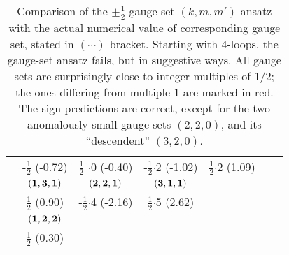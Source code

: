 \begin{table}
{\begin{tabular}{r@{~~~~}ccccc@{~~~~}l}
                 & -$\frac{1}{2}$ (-0.72)   & $\frac{1}{2}$  {\color{red} $\cdot 0$ (-0.40)}
                                        & -$\frac{1}{2}${\color{red}$\cdot$2} (-1.02)
                                             &  $\frac{1}{2}${\color{red}$\cdot$2} (1.09)
 \\%
\raisebox{1.5ex}{10}
 & $\bf (1,3,1)$  & $\bf (2,2,1)$ & $\bf (3,1,1)$ &&&
        \raisebox{1.5ex}{$\frac{3}{2} {\color{red} \cdot 4}\,(6.78)$}\\
 &  $\frac{1}{2}$ (0.90)    & -$\frac{1}{2}${\color{red}$\cdot$4} (-2.16)
                                  & $\frac{1}{2}${\color{red}$\cdot$5} (2.62)
  \\[1ex]
 & $\bf (1,2,2)$ \\
 & $\frac{1}{2}$ (0.30)
  \\[1ex]
\bottomrule
\end{tabular}
} %
\caption{\label{tabGaugeSets}
Comparison of the $\pm\frac{1}{2}$ gauge-set $(k,m,m')$ ansatz 
with the actual numerical value of corresponding gauge set, stated in $(\cdots)$
bracket.
Starting with 4-loops, the gauge-set ansatz  fails, but in
suggestive ways.
All gauge sets are surprisingly close to integer multiples of 1/2;
the ones differing from multiple 1 are marked in red.
The sign predictions are correct, except for the two anomalously small gauge sets
$(2,2,0)$, and its ``descendent'' $(3,2,0)$.
}
\end{table}
